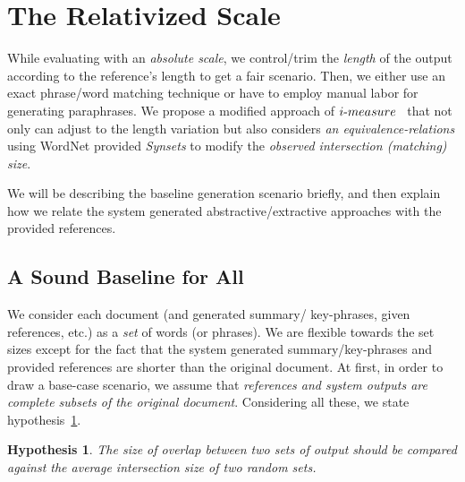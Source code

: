 \documentclass[a4paper]{report}
\newtheorem{hypothesis}{Hypothesis}
\begin{document}
\section{The Relativized Scale}
While evaluating with an \emph{absolute scale}, we control/trim the \emph{length} of the output according to the reference's length to get a fair scenario. Then, we either use an exact phrase/word matching technique or have to employ manual labor for generating paraphrases. We propose a modified approach of $i\hbox{-}measure$~\cite{DBLP:conf/ecir/HamidHT16} that not only can adjust to the length variation but also considers \emph{an equivalence-relations} using WordNet provided \emph{Synsets} to modify the \emph{observed intersection (matching) size}.
\par We will be describing the baseline generation scenario briefly, and then explain how we relate the system generated abstractive/extractive approaches with the provided references.
\subsection{A Sound Baseline for All}
We consider each document (and generated summary/ key-phrases, given references, etc.) as a \emph{set} of words (or phrases). We are flexible towards the set sizes except for the fact that the system generated summary/key-phrases and provided references are shorter than the original document. At first, in order to draw a base-case scenario, we assume that \emph{references and system outputs are complete subsets of the original document}. 
Considering all these, we state hypothesis~\ref{hp}.

\begin{hypothesis}
\label{hp}
The size of overlap between two sets of output should be compared against the average intersection size of two random sets.
\end{hypothesis}

\end{document}
